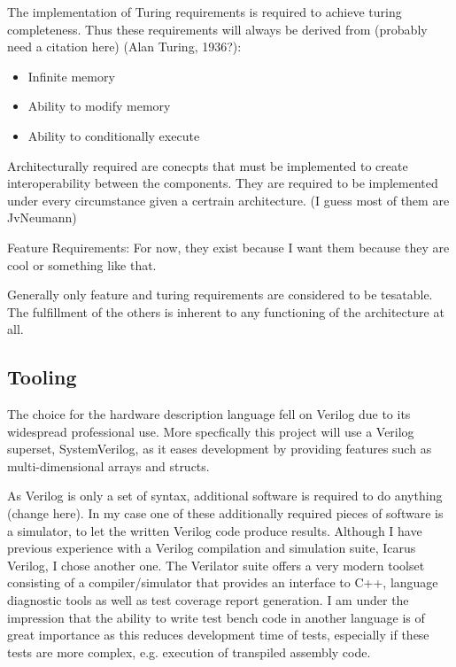 \newtheorem{turing-requirement}{Turing Req.}[subsection]
The implementation of Turing requirements is required to achieve turing completeness. Thus these requirements will always be derived from (probably need a citation here) (Alan Turing, 1936?): 
\begin{itemize}
  \item Infinite memory
  \item Ability to modify memory
  \item Ability to conditionally execute
\end{itemize}

\newtheorem{arch-requirement}{Arch. Req.}[subsection]
Architecturally required are conecpts that must be implemented to create interoperability between the components. They are required to be implemented under every circumstance given a certrain architecture. (I guess most of them are JvNeumann)

\newtheorem{feat-requirement}{Feat. Req.}[subsection]
Feature Requirements: For now, they exist because I want them because they are cool or something like that.


Generally only feature and turing requirements are considered to be tesatable. The fulfillment of the others is inherent to any functioning of the architecture at all. 

\subsection{Tooling}

The choice for the hardware description language fell on Verilog due to its widespread professional use. More specfically this project will use a Verilog superset, SystemVerilog, as it eases development by providing features such as multi-dimensional arrays and structs. 

As Verilog is only a set of syntax, additional software is required to do anything (change here). In my case one of these additionally required pieces of software is a simulator, to let the written Verilog code produce results. Although I have previous experience with a Verilog compilation and simulation suite, Icarus Verilog, I chose another one. The Verilator suite offers a very modern toolset consisting of a compiler/simulator that provides an interface to C++, language diagnostic tools as well as test coverage report generation. I am under the impression that the ability to write test bench code in another language is of great importance as this reduces development time of tests, especially if these tests are more complex, e.g. execution of transpiled assembly code. 

